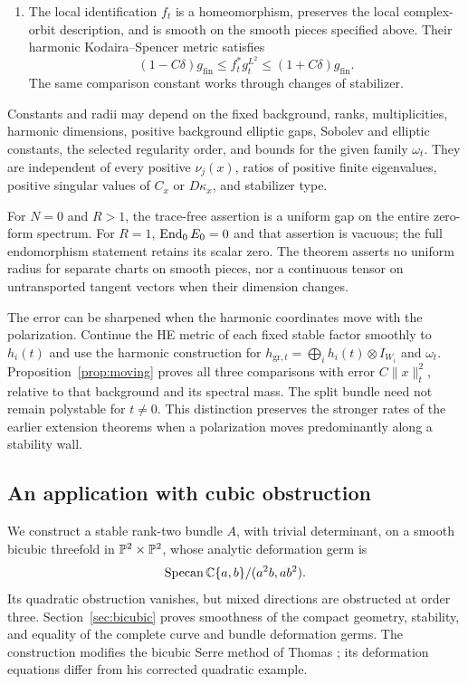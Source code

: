 \begin{theorem}
\begin{enumerate}
\item The local identification $f_t$ is a homeomorphism, preserves the
local complex-orbit description, and is smooth on the smooth pieces
specified above. Their harmonic Kodaira--Spencer metric satisfies
\begin{equation}\label{eq:quotient-main}
 (1-C\delta)g_{\mathrm{fin}}\le f_t^*g_t^{L^2}
                                      \le(1+C\delta)g_{\mathrm{fin}} .
\end{equation}
The same comparison constant works through changes of stabilizer.
\end{enumerate}
Constants and radii may depend on the fixed background, ranks,
multiplicities, harmonic dimensions, positive background elliptic
gaps, Sobolev and elliptic constants, the selected regularity order,
and bounds for the given family $\omega_t$. They are independent of
every positive $\nu_j(x)$, ratios of positive finite eigenvalues,
positive singular values of $C_x$ or $D\kappa_x$, and stabilizer type.
\end{theorem}

For $N=0$ and $R>1$, the trace-free assertion is a uniform gap on the
entire zero-form spectrum. For $R=1$, $\operatorname{End}_0E_0=0$ and that assertion
is vacuous; the full endomorphism statement retains its scalar zero.
The theorem asserts no uniform radius for separate charts on smooth
pieces, nor a continuous tensor on untransported tangent vectors when
their dimension changes.

The error can be sharpened when the harmonic coordinates move with the
polarization. Continue the HE metric of each fixed stable factor
smoothly to $h_i(t)$ and use the harmonic construction for
$h_{\mathrm{gr},t}=\bigoplus_i h_i(t)\otimes I_{W_i}$ and $\omega_t$.
Proposition~\ref{prop:moving} proves all three comparisons with error
$C\|x\|_t^2$, relative to that background and its spectral mass.
The split bundle need not remain polystable for $t\ne0$.
This distinction preserves the stronger rates of the earlier extension
theorems when a polarization moves predominantly along a stability wall.

\subsection{An application with cubic obstruction}
We construct a stable rank-two bundle $A$, with trivial determinant,
on a smooth bicubic threefold in $\mathbb P^2\times\mathbb P^2$, whose analytic
deformation germ is
\begin{equation}\label{eq:cubic-intro}
 \operatorname{Specan}\mathbb C\{a,b\}/(a^2b,ab^2).
\end{equation}
Its quadratic obstruction vanishes, but mixed directions are obstructed
at order three. Section~\ref{sec:bicubic} proves smoothness of the compact
geometry, stability, and equality of the complete curve and bundle
deformation germs. The construction modifies the bicubic Serre method
of Thomas \cite{thomas}; its deformation equations differ from his
corrected quadratic example.

